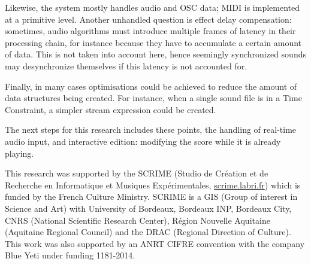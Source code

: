 \documentclass{article}
\begin{document}
Likewise, the system mostly handles audio and OSC data; MIDI is implemented at a primitive level.
Another unhandled question is effect delay compensation: sometimes, audio algorithms must introduce multiple frames of latency in their processing chain, for instance because they have to accumulate a certain amount of data.
This is not taken into account here, hence seemingly synchronized sounds may desynchronize themselves if this latency is not accounted for.

Finally, in many cases optimisations could be achieved to reduce the amount of data structures being created. For instance, when a single sound file is in a Time Constraint, a simpler stream expression could be created.

The next steps for this research includes these points, the handling of real-time audio input, and interactive edition: modifying the score while it is already playing.

\begin{acknowledgments}
    This research was supported by the SCRIME (Studio de Création et de Recherche en Informatique et Musiques Expérimentales, \url{scrime.labri.fr}) which is funded by the French Culture Ministry. 
    SCRIME is a GIS (Group of interest in Science and Art) with University of Bordeaux, 
    Bordeaux INP, Bordeaux City, CNRS (National Scientific Research Center), Région Nouvelle Aquitaine (Aquitaine Regional Council) and the DRAC (Regional Direction of Culture).
	This work was also supported by an ANRT CIFRE convention with the company Blue Yeti under funding 1181-2014. 
\end{acknowledgments} 



\end{document}
